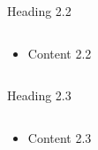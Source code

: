 \documentclass{sintefbeamer}
\begin{document}
\begin{frame}{Heading 2.2}
    \begin{columns}
        \begin{column}{0.6\textwidth}
            \begin{itemize}
                \item Content 2.2
            \end{itemize}
        \end{column}
        \begin{column}{0.3\textwidth}
            
        \end{column}
    \end{columns}
\end{frame}

\begin{frame}{Heading 2.3}
    \begin{columns}
        \begin{column}{0.6\textwidth}
            \begin{itemize}
                \item Content 2.3
            \end{itemize}
        \end{column}
        \begin{column}{0.3\textwidth}
            
        \end{column}
    \end{columns}
\end{frame}

\backmatter
\end{document}
